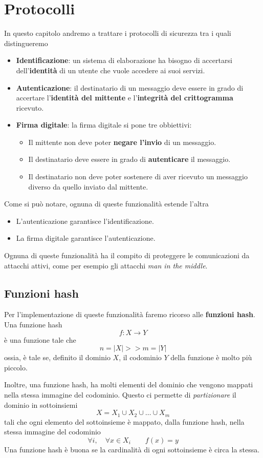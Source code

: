 \chapter{Protocolli}
In questo capitolo andremo a trattare i protocolli di sicurezza tra i quali distingueremo
\begin{itemize}
	\item \textbf{Identificazione}: un sistema di elaborazione ha bisogno di accertarsi dell'\textbf{identit\`a}
	      di un utente che vuole accedere ai suoi servizi.
	\item \textbf{Autenticazione}: il destinatario di un messaggio deve essere in grado di accertare
	      l'\textbf{identit\`a del mittente} e l'\textbf{integrit\`a del crittogramma} ricevuto.
	\item \textbf{Firma digitale}: la firma digitale si pone tre obbiettivi:
	      \begin{itemize}
		      \item Il mittente non deve poter \textbf{negare l'invio} di un messaggio.
		      \item Il destinatario deve essere in grado di \textbf{autenticare} il messaggio.
		      \item Il destinatario non deve poter sostenere di aver ricevuto un messaggio diverso da quello inviato
		            dal mittente.
	      \end{itemize}
\end{itemize}
Come si pu\`o notare, ognuna di queste funzionalit\`a estende l'altra
\begin{itemize}
	\item L'autenticazione garantisce l'identificazione.
	\item La firma digitale garantisce l'autenticazione.
\end{itemize}
Ognuna di queste funzionalit\`a ha il compito di proteggere le comunicazioni da attacchi attivi, come per esempio
gli attacchi \emph{man in the middle}.

\section{Funzioni hash}
Per l'implementazione di queste funzionalit\`a faremo ricorso alle \textbf{funzioni hash}. Una funzione hash
\[ f : X \rightarrow Y \]
\`e una funzione tale che
\[ n = |X| >> m = |Y| \]
ossia, \`e tale se, definito il dominio $X$, il codominio $Y$ della funzione \`e molto pi\`u piccolo.

Inoltre, una funzione hash, ha molti elementi del dominio che vengono mappati nella stessa immagine del codominio.
Questo ci permette di \emph{partizionare} il dominio in sottoinsiemi
\[ X = X_1 \cup X_2 \cup \dots \cup X_m \]
tali che ogni elemento del sottoinsieme \`e mappato, dalla funzione hash, nella stessa immagine del codominio
\[ \forall i, \quad \forall x \in X_i \quad \quad f(x) = y \]
Una funzione hash \`e buona se la cardinalit\`a di ogni sottoinsieme \`e circa la stessa.

